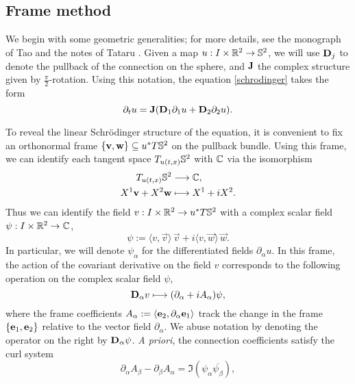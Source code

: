 

\subsection{Frame method}

We begin with some geometric generalities; for more details, see the monograph of Tao \cite[Chapter 6.2]{Tao2006} and the notes of Tataru \cite[Geometric Dispersive Equations]{KochEtAl2014}.  Given a map $u : I \times \mathbb R^2 \to \mathbb S^2$, we will use ${\bf D}_j$ to denote the pullback of the connection on the sphere, and ${\bf J}$ the complex structure given by $\tfrac\pi2$-rotation. Using this notation, the equation \eqref{schrodinger} takes the form
\begin{equation}\label{eq:geoschrod}
        \partial_t u 
            = {\bf J} ({\bf D}_1 \partial_1 u + {\bf D}_2 \partial_2 u).
\end{equation}


To reveal the linear Schr\"odinger structure of the equation, it is convenient to fix an orthonormal frame $\{\mathbf v, \mathbf w\} \subseteq u^* T\mathbb S^2$ on the pullback bundle. Using this frame, we can identify each tangent space $T_{u(t, x)} \mathbb S^2$ with $\mathbb C$ via the isomorphism 
    \begin{align*}
        T_{u(t, x)} \mathbb S^2
            &\longrightarrow \mathbb C, \\
        X^1 \mathbf v + X^2 \mathbf w 
            &\longmapsto X^1 + i X^2.        
    \end{align*}
Thus we can identify the field $v : I \times \mathbb R^2 \to u^* T\mathbb S^2$ with a complex scalar field $\psi: I \times \mathbb R^2 \to \mathbb C$, 
    \[
        \psi 
            := \big\langle v, \vec v \big\rangle \, \vec v + i \big\langle v, \vec w \big\rangle \, \vec w.
    \]
In particular, we will denote $\psi_\alpha$ for the differentiated fields $\partial_\alpha u$. In this frame, the action of the covariant derivative on the field $v$ corresponds to the following operation on the complex scalar field $\psi$, 
    \[
        {\bf D}_\alpha v 
            \longmapsto (\partial_\alpha + i A_\alpha) \psi, 
    \]
where the frame coefficients $A_\alpha := \langle {\bf e}_2, \partial_\alpha {\bf e}_1 \rangle$ track the change in the frame $\{{\bf e}_1, {\bf e}_2\}$ relative to the vector field $\partial_\alpha$. We abuse notation by denoting the operator on the right by ${\bf D}_\alpha \psi$. \textit{A priori}, the connection coefficients satisfy the curl system 
    \begin{equation}\label{eq:curvature}
        \partial_\alpha A_\beta - \partial_\beta A_\alpha 
            = \Im (\psi_\alpha \overline{\psi_\beta}),
    \end{equation}


